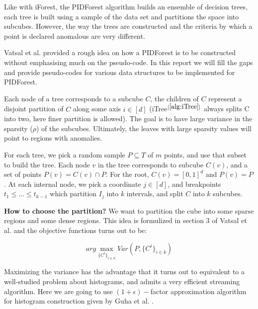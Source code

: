 Like with iForest, the PIDForest algorithm builds an ensemble of decision trees, each tree is built using a sample of the data set and partitions the space into subcubes. 
However, the way the trees are constructed and the criteria by which a point is declared anomalous are very different.

Vatsal et al. \cite{NIPS2019_9710} provided a rough idea on how a PIDForest is to be constructed without emphasising much on the pseudo-code. In this report we will fill the gaps and provide pseudo-codes for various data structures to be implemented for PIDForest.

Each node of a tree corresponds to a subcube $C$, the children of $C$ represent a disjoint partition of $C$ along some axis $i \in [d]$ (iTree$^{[\ref{alg:iTree}]}$ always splits C into two, here finer partition is allowed). 
The goal is to have large variance in the sparsity ($\rho$) of the subcubes. 
Ultimately, the leaves with large sparsity values will point to regions with anomalies.

For each tree, we pick a random sample $P \subseteq T$ of $m$ points, and use that subset to build the tree.
Each node $v$ in the tree corresponds to subcube $C(v)$, and a set of points $P(v) = C(v) \cap P$.
For the root, $C(v) = [0, 1]^d$ and $P (v) = P$. 
At each internal node, we pick a coordinate $j \in [d]$, and breakpoints $t_{1} \leq ... \leq t_{k-1}$ which partition $I_j$ into $k$ intervals, and split $C$ into $k$ subcubes. 

\textbf{How to choose the partition?} We want to partition the cube into some sparse regions and some dense regions. 
This idea is formulized in section 3 of Vatsal et al. \cite{NIPS2019_9710} and the objective functions turns out to be:

\vspace{-1em}
\begin{equation}
    \label{eq:maximizing-variance}
        arg \max_{ \{ C^i \}_{i \in k} } Var(P, \{ C^i \}_{i \in k})
\end{equation}

Maximizing the variance has the advantage that it turns out to equivalent to a well-studied problem about histograms, and admits a very efficient streaming algorithm. Here we are going to use $(1+ \epsilon)-$factor approximation algorithm for histogram construction given by Guha et al. \cite{10.1145/1132863.1132873}.



